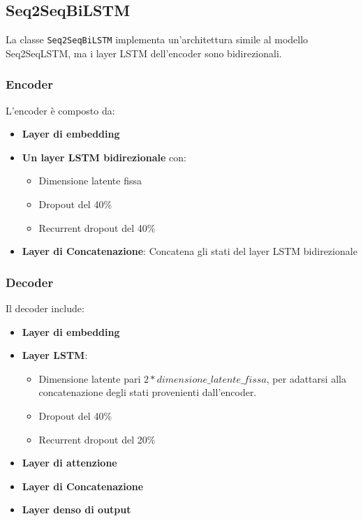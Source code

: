 \documentclass[a4paper, 12pt]{article}
\begin{document}
\subsection{Seq2SeqBiLSTM}
La classe \texttt{Seq2SeqBiLSTM} implementa un'architettura simile al modello Seq2SeqLSTM, ma i layer LSTM dell'encoder sono bidirezionali.\\

\subsubsection{Encoder}
L'encoder è composto da:
\begin{itemize}
    \item \textbf{Layer di embedding}
    \item \textbf{Un layer LSTM bidirezionale} con:
        \begin{itemize}
            \item Dimensione latente fissa
            \item Dropout del 40\%
            \item Recurrent dropout del 40\%
        \end{itemize}
    \item \textbf{Layer di Concatenazione}: Concatena gli stati del layer LSTM bidirezionale
\end{itemize}

\subsubsection{Decoder}
Il decoder include:
\begin{itemize}
    \item \textbf{Layer di embedding}
    \item \textbf{Layer LSTM}:
        \begin{itemize}
            \item Dimensione latente pari \(2 * \textit{dimensione\_latente\_fissa}\), per adattarsi alla concatenazione degli stati provenienti dall'encoder.
            \item Dropout del 40\%
            \item Recurrent dropout del 20\%
        \end{itemize}
    \item \textbf{Layer di attenzione}
    \item \textbf{Layer di Concatenazione}
    \item \textbf{Layer denso di output}
\end{itemize}
\end{document}
